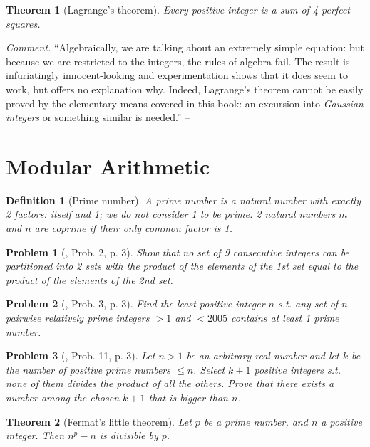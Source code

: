 \documentclass[oneside]{book}
\numberwithin{equation}{section}
\newtheorem{definition}{Definition}[section]
\newtheorem{problem}{Problem}[section]
\newtheorem{theorem}{Theorem}[section]
\begin{document}
\begin{theorem}[Lagrange's theorem]
	Every positive integer is a sum of 4 perfect squares.
\end{theorem}
\textit{Comment.} ``Algebraically, we are talking about an extremely simple equation: but because we are restricted to the integers, the rules of algebra fail. The result is infuriatingly innocent-looking and experimentation shows that it does seem to work, but offers no explanation why. Indeed, Lagrange's theorem cannot be easily proved by the elementary means covered in this book: an excursion into \textit{Gaussian integers} or something similar is needed.'' -- \cite[Chap. 2, p. 9]{Tao2006}

\section{Modular Arithmetic}
\begin{definition}[Prime number]
	A \emph{prime number} is a natural number with exactly 2 factors: itself and 1; we do not consider 1 to be prime. 2 natural numbers $m$ and $n$ are \emph{coprime} if their only common factor is 1.
\end{definition}

\begin{problem}[\cite{Gelca_Andreescu2017}, Prob. 2, p. 3]
	Show that no set of 9 consecutive integers can be partitioned into 2 sets with the product of the elements of the 1st set equal to the product of the elements of the 2nd set.
\end{problem}

\begin{problem}[\cite{Gelca_Andreescu2017}, Prob. 3, p. 3]
	Find the least positive integer $n$ s.t. any set of $n$ pairwise relatively prime integers $> 1$ and $< 2005$ contains at least 1 prime number.
\end{problem}

\begin{problem}[\cite{Gelca_Andreescu2017}, Prob. 11, p. 3]
	Let $n > 1$ be an arbitrary real number and let $k$ be the number of positive prime numbers $\le n$. Select $k + 1$ positive integers s.t. none of them divides the product of all the others. Prove that there exists a number among the chosen $k + 1$ that is bigger than $n$.
\end{problem}

\begin{theorem}[Fermat's little theorem]
	Let $p$ be a prime number, and $n$ a positive integer. Then $n^p - n$ is divisible by $p$.
\end{theorem}
\end{document}

